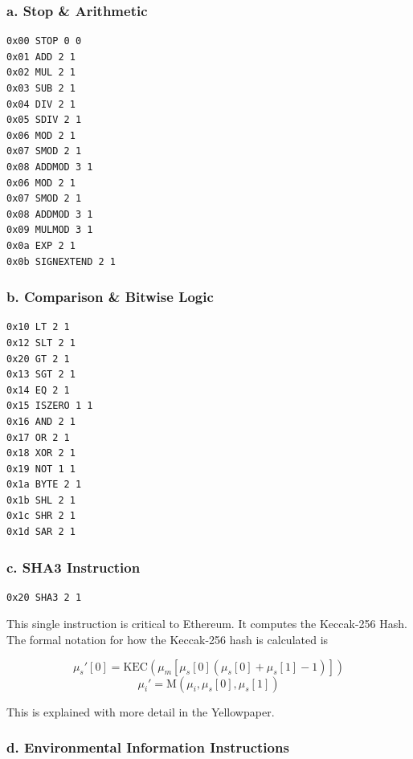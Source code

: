 
\subsubsection*{a. Stop \& Arithmetic}

\begin{lstlisting}[style=defaultStyle, caption={Stop and Arithmetic Instructions.}]
0x00 STOP 0 0
0x01 ADD 2 1
0x02 MUL 2 1
0x03 SUB 2 1
0x04 DIV 2 1
0x05 SDIV 2 1
0x06 MOD 2 1
0x07 SMOD 2 1
0x08 ADDMOD 3 1
0x06 MOD 2 1
0x07 SMOD 2 1
0x08 ADDMOD 3 1
0x09 MULMOD 3 1
0x0a EXP 2 1
0x0b SIGNEXTEND 2 1
\end{lstlisting}

\subsubsection*{b. Comparison \& Bitwise Logic}

\begin{lstlisting}[style=defaultStyle, caption={Comparison and Bitwise Logic instructions.}]
0x10 LT 2 1
0x12 SLT 2 1
0x20 GT 2 1
0x13 SGT 2 1
0x14 EQ 2 1
0x15 ISZERO 1 1
0x16 AND 2 1
0x17 OR 2 1
0x18 XOR 2 1
0x19 NOT 1 1
0x1a BYTE 2 1   
0x1b SHL 2 1
0x1c SHR 2 1
0x1d SAR 2 1
\end{lstlisting}

\subsubsection*{c. SHA3 Instruction}

\begin{lstlisting}[style=defaultStyle, caption={SHA3 instruction.}]
0x20 SHA3 2 1
\end{lstlisting}

This single instruction is critical to Ethereum.
It computes the Keccak-256 Hash.
The formal notation for how the Keccak-256 hash is calculated is

$$
\mu_s'[0]=\text{KEC}\left(\mu_m\left[\mu_s[0]\left(\mu_s[0]+\mu_s[1]-1\right)\right]\right)
$$
$$
\mu_i'=\text{M}\left(\mu_i,\mu_s[0],\mu_s[1]\right)
$$

This is explained with more detail in the Yellowpaper.

\subsubsection*{d. Environmental Information Instructions}

